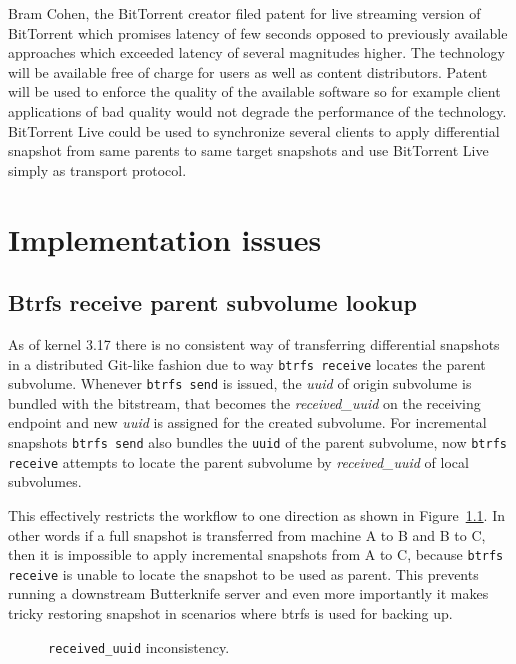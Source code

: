 \documentclass[a4paper,11pt]{kth-mag}
\begin{document}
Bram Cohen, the BitTorrent creator filed patent for
live streaming version of BitTorrent
\cite{bittorrent-live} which promises
latency of few seconds opposed to previously available approaches
which exceeded latency of several magnitudes higher.
The technology will be available free of charge for users as well as
content distributors. Patent will be used to enforce
the quality of the available software so
for example client applications of bad quality would not
degrade the performance of the technology.
BitTorrent Live could be used to synchronize several clients
to apply differential snapshot from same parents to same target snapshots
and use BitTorrent Live simply as transport protocol.



%
%
%
%
\chapter{Implementation issues}
\label{chap:impl}

\section{Btrfs receive parent subvolume lookup}

As of kernel 3.17 there is no consistent way of transferring
differential snapshots in a distributed Git-like fashion due to way
\lstinline!btrfs receive! locates the parent subvolume.
Whenever \lstinline!btrfs send! is issued, the \emph{uuid} of origin
subvolume is bundled with the bitstream, that becomes
the \emph{received\_uuid} on the receiving endpoint and
new \emph{uuid} is assigned for the created subvolume.
For incremental snapshots \lstinline!btrfs send! also bundles
the \lstinline!uuid! of the parent subvolume,
now \lstinline!btrfs receive! attempts to locate the parent
subvolume by \emph{received\_uuid} of local subvolumes.

This effectively restricts the workflow to one direction
as shown in Figure~\ref{fig:btrfs-received-uuid-issue}.
In other words if a full snapshot is transferred
from machine A to B and B to C, then it is impossible
to apply incremental snapshots from A to C, because
\lstinline!btrfs receive! is unable to locate the snapshot
to be used as parent.
This prevents running a downstream Butterknife server and
even more importantly it makes tricky restoring snapshot
in scenarios where \acrshort{btrfs} is used for backing up.

\begin{figure}[!htb]
\centering
\scalebox{0.5}{}
\caption{\lstinline!received_uuid! inconsistency.}
\label{fig:btrfs-received-uuid-issue}
\end{figure}
\end{document}
